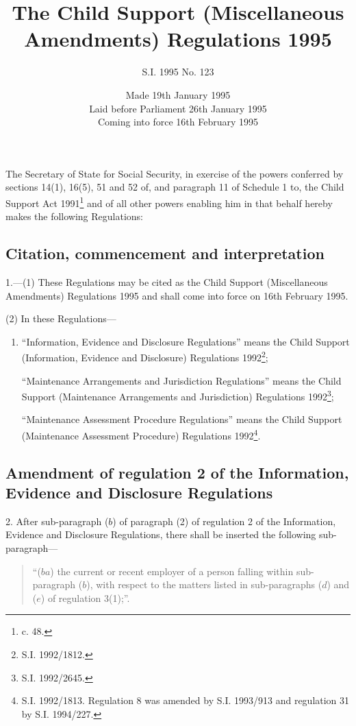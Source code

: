 \documentclass[a4paper]{article}
\title{The Child Support (Miscellaneous Amendments) Regulations 1995}
\author{S.I. 1995 No. 123}
\date{Made 19th January 1995\\Laid before Parliament 26th January 1995\\Coming into force 16th February 1995}
\begin{document}
\maketitle

\noindent
The Secretary of State for Social Security, in exercise of the powers conferred by sections 14(1), 16(5), 51 and 52 of, and paragraph 11 of Schedule 1 to, the Child Support Act 1991\footnote{ c. 48.} and of all other powers enabling him in that behalf hereby makes the following Regulations:

{\sloppy

\tableofcontents

}

\setcounter{secnumdepth}{-2}

\subsection[1. Citation, commencement and interpretation]{Citation, commencement and interpretation}

1.—(1) These Regulations may be cited as the Child Support (Miscellaneous Amendments) Regulations 1995 and shall come into force on 16th February 1995.

(2) In these Regulations—
\begin{enumerate}\item[]
“Information, Evidence and Disclosure Regulations” means the Child Support (Information, Evidence and Disclosure) Regulations 1992\footnote{\frenchspacing S.I. 1992/1812.};

“Maintenance Arrangements and Jurisdiction Regulations” means the Child Support (Maintenance Arrangements and Jurisdiction) Regulations 1992\footnote{\frenchspacing S.I. 1992/2645.};

“Maintenance Assessment Procedure Regulations” means the Child Support (Maintenance Assessment Procedure) Regulations 1992\footnote{\frenchspacing S.I. 1992/1813. Regulation 8 was amended by S.I. 1993/913 and regulation 31 by S.I. 1994/227.}.
\end{enumerate}

\subsection[2. Amendment of regulation 2 of the Information, Evidence and Disclosure Regulations]{Amendment of regulation 2 of the Information, Evidence and Disclosure Regulations}

2.  After sub-paragraph ($b$) of paragraph (2) of regulation 2 of the Information, Evidence and Disclosure Regulations, there shall be inserted the following sub-paragraph—
\begin{quotation}
“($ba$) the current or recent employer of a person falling within sub-paragraph ($b$), with respect to the matters listed in sub-\hspace{0pt}paragraphs ($d$) and ($e$) of regulation 3(1);”.
\end{quotation}
\end{document}
